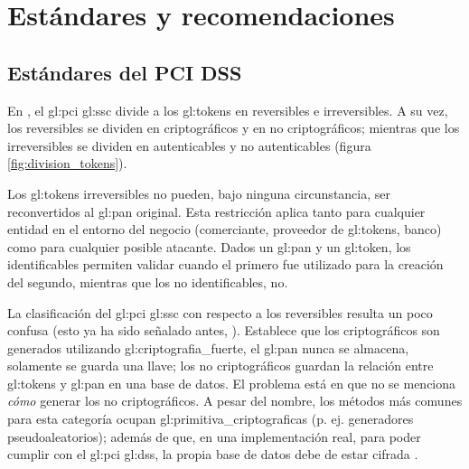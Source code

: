 %
%

\section{Estándares y recomendaciones}
\label{sec:estandares}

\subsection{Estándares del PCI DSS}

En \cite{pci_tokens}, el \gls{gl:pci} \gls{gl:ssc} divide a los
\glspl{gl:token} en reversibles e irreversibles. A su vez, los reversibles se
dividen en criptográficos y en no criptográficos; mientras que los
irreversibles se dividen en autenticables y no autenticables (figura
\ref{fig:division_tokens}).

Los \glspl{gl:token} irreversibles no pueden, bajo ninguna circunstancia, ser
reconvertidos al \gls{gl:pan} original. Esta restricción aplica tanto para
cualquier entidad en el entorno del negocio (comerciante, proveedor de
\glspl{gl:token}, banco) como para cualquier posible atacante. Dados un
\gls{gl:pan} y un \gls{gl:token}, los identificables permiten validar cuando el
primero fue utilizado para la creación del segundo, mientras que los no
identificables, no.



La clasificación del \gls{gl:pci} \gls{gl:ssc} con respecto a los reversibles
resulta un poco confusa (esto ya ha sido señalado antes, \cite{doc_sandra}).
Establece que los criptográficos son generados utilizando
\gls{gl:criptografia_fuerte}, el \gls{gl:pan} nunca se almacena, solamente se
guarda una llave; los no criptográficos guardan la relación entre
\glspl{gl:token} y \gls{gl:pan} en una base de datos. El problema está en que
no se menciona \textit{cómo} generar los no criptográficos. A pesar del nombre,
los métodos más comunes para esta categoría ocupan
\glspl{gl:primitiva_criptografica} (p. ej. generadores pseudoaleatorios); además
de que, en una implementación real, para poder cumplir con el \gls{gl:pci}
\gls{gl:dss}, la propia base de datos debe de estar cifrada \cite{pci_dss}.

